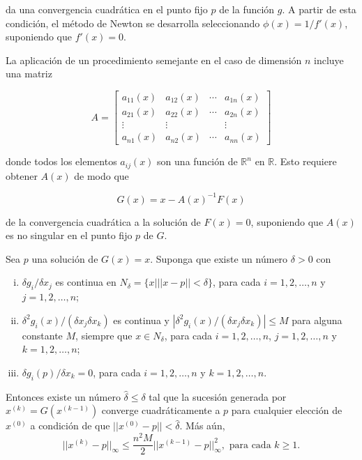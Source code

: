 da una convergencia cuadrática en el punto fijo $p$ de la función $g$. A partir de esta condición, el método de Newton se desarrolla 
seleccionando $\phi(x) = 1/f'(x)$, suponiendo que $f'(x)=0$.

La aplicación de un procedimiento semejante en el caso de dimensión $n$ incluye una matriz

\begin{equation}
	A = \begin{bmatrix}
		a_{11}(x) & a_{12}(x) & \cdots & a_{1n}(x) \\ 
		a_{21}(x) & a_{22}(x) & \cdots & a_{2n}(x) \\ 
		\vdots & \vdots &  & \vdots \\ 
		a_{n1}(x) & a_{n2}(x) & \cdots & a_{nn}(x)
	\end{bmatrix}
	\label{eq:SENLNewton1}
\end{equation}

donde todos los elementos $a_{ij}(x)$ son una función de $\mathbb{R}^n$ en $\mathbb{R}$. Esto requiere obtener $A(x)$ de modo que 

\begin{equation*}
	G(x) = x-A(x)^{-1}F(x)
\end{equation*}

de la convergencia cuadrática a la solución de $F(x) = 0$, suponiendo que $A(x)$ es no singular en el punto fijo $p$ de $G$.

\begin{theorem}[]
	Sea $p$ una solución de $G(x)=x$. Suponga que existe un número $\delta >0$ con
	\begin{enumerate}[(i)]
		\item $\delta g_i/\delta x_j$ es continua en $N_\delta = \{x| ||x-p||<\delta \}$, para cada $i=1,2,\dots,n$ y $j=1,2,\dots,n$;
		\item $\delta^2g_i(x)/(\delta x_j\delta x_k)$ es continua y $|\delta^2g_i(x)/(\delta x_j\delta x_k)|\leq M$ para alguna constante $M$, 
			siempre que $x\in N_{\delta}$, para cada $i=1,2,\dots, n$, $j=1,2,\dots,n$ y $k=1,2,\dots,n$; 
		\item $\delta g_i(p)/\delta x_k = 0$, para cada $i=1,2,\dots,n$ y $k=1,2,\dots,n$.
	\end{enumerate}		
	Entonces existe un número $\hat{\delta}\leq \delta$ tal que la sucesión generada por $x^{(k)} = G(x^{(k-1)})$ converge cuadráticamente a $p$ 
	para cualquier elección de $x^{(0)}$ a condición de que $||x^{(0)} - p|| < \hat{\delta}$. Más aún,
	\begin{equation*}
		||x^{(k)} - p||_\infty \leq \frac{n^2M}{2}||x^{(k-1)}-p||_\infty^2, \text{ para cada } k\geq 1.
	\end{equation*}	 
	\label{teo:SENLNewton}	
\end{theorem}

